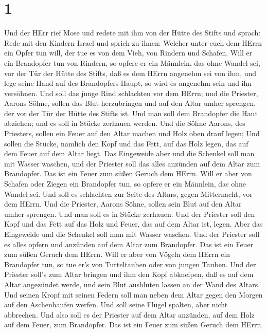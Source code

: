 \hypertarget{section}{%
\section{1}\label{section}}

 Und der HErr rief Mose und redete mit ihm von der Hütte des
Stifts und sprach:  Rede mit den Kindern Israel und sprich
zu ihnen: Welcher unter euch dem HErrn ein Opfer tun will, der tue es
von dem Vieh, von Rindern und Schafen.  Will er ein
Brandopfer tun von Rindern, so opfere er ein Männlein, das ohne Wandel
sei, vor der Tür der Hütte des Stifts, daß es dem HErrn angenehm sei von
ihm,  und lege seine Hand auf des Brandopfers Haupt, so wird
es angenehm sein und ihn versöhnen.  Und soll das junge Rind
schlachten vor dem HErrn; und die Priester, Aarons Söhne, sollen das
Blut herzubringen und auf den Altar umher sprengen, der vor der Tür der
Hütte des Stifts ist.  Und man soll dem Brandopfer die Haut
abziehen; und es soll in Stücke zerhauen werden.  Und die
Söhne Aarons, des Priesters, sollen ein Feuer auf den Altar machen und
Holz oben drauf legen;  Und sollen die Stücke, nämlich den
Kopf und das Fett, auf das Holz legen, das auf dem Feuer auf dem Altar
liegt.  Das Eingeweide aber und die Schenkel soll man mit
Wasser waschen, und der Priester soll das alles anzünden auf dem Altar
zum Brandopfer. Das ist ein Feuer zum süßen Geruch dem HErrn.
 Will er aber von Schafen oder Ziegen ein Brandopfer tun,
so opfere er ein Männlein, das ohne Wandel sei.  Und soll
es schlachten zur Seite des Altars, gegen Mitternacht, vor dem HErrn.
Und die Priester, Aarons Söhne, sollen sein Blut auf den Altar umher
sprengen.  Und man soll es in Stücke zerhauen. Und der
Priester soll den Kopf und das Fett auf das Holz und Feuer, das auf dem
Altar ist, legen.  Aber das Eingeweide und die Schenkel
soll man mit Wasser waschen. Und der Priester soll es alles opfern und
anzünden auf dem Altar zum Brandopfer. Das ist ein Feuer zum süßen
Geruch dem HErrn.  Will er aber von Vögeln dem HErrn ein
Brandopfer tun, so tue er's von Turteltauben oder von jungen Tauben.
 Und der Priester soll's zum Altar bringen und ihm den Kopf
abkneipen, daß es auf dem Altar angezündet werde, und sein Blut
ausbluten lassen an der Wand des Altars.  Und seinen Kropf
mit seinen Federn soll man neben dem Altar gegen den Morgen auf den
Aschenhaufen werfen.  Und soll seine Flügel spalten, aber
nicht abbrechen. Und also soll es der Priester auf dem Altar anzünden,
auf dem Holz auf dem Feuer, zum Brandopfer. Das ist ein Feuer zum süßen
Geruch dem HErrn.


